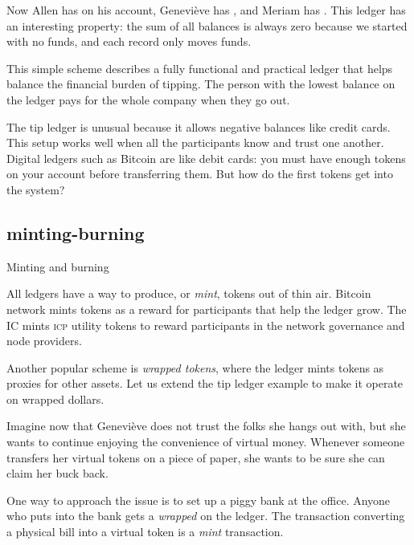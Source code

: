 \documentclass{article}
\begin{document}
Now Allen has  on his account, Geneviève has , and Meriam has .
This ledger has an interesting property: the sum of all balances is always zero because we started with no funds, and each record only moves funds.

This simple scheme describes a fully functional and practical ledger that helps balance the financial burden of tipping.
The person with the lowest balance on the ledger pays for the whole company when they go out.

The tip ledger is unusual because it allows negative balances like credit cards.
This setup works well when all the participants know and trust one another.
Digital ledgers such as Bitcoin are like debit cards: you must have enough tokens on your account before transferring them.
But how do the first tokens get into the system?

\subsection{minting-burning}{Minting and burning}

All ledgers have a way to produce, or \emph{mint}, tokens out of thin air.
Bitcoin network mints tokens as a reward for participants that help the ledger grow.
The IC mints \textsc{icp} utility tokens to reward participants in the network governance and node providers.

Another popular scheme is \emph{wrapped tokens}, where the ledger mints tokens as proxies for other assets.
Let us extend the tip ledger example to make it operate on wrapped dollars.

Imagine now that Geneviève does not trust the folks she hangs out with, but she wants to continue enjoying the convenience of virtual money.
Whenever someone transfers her virtual tokens on a piece of paper, she wants to be sure she can claim her buck back.

One way to approach the issue is to set up a piggy bank at the office.
Anyone who puts  into the bank gets a \emph{wrapped}  on the ledger.
The transaction converting a physical bill into a virtual token is a \emph{mint} transaction.
\end{document}
